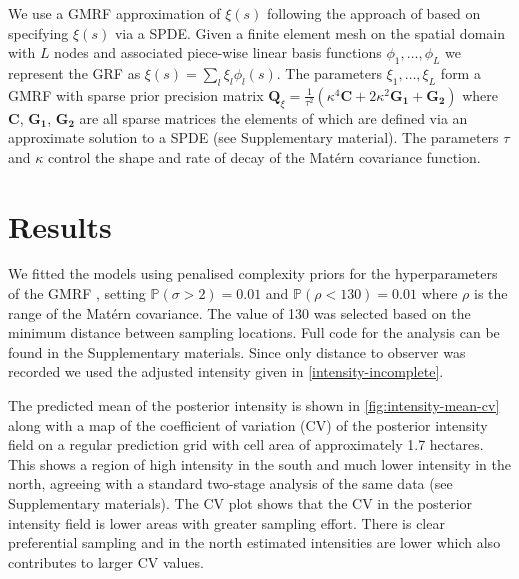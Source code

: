\documentclass[preprint,12pt]{elsarticle}
\newcommand{\bm}{\boldsymbol}  %
\begin{document}
We use a GMRF approximation of $\xi(s)$ following the approach of \cite{lindgren_explicit_2011} based on specifying $\xi(s)$ via a SPDE.  Given a finite element mesh on the spatial domain with $L$ nodes and associated piece-wise linear basis functions $\phi_1, \ldots, \phi_L$ we represent the GRF as $\xi(s) = \sum_l \xi_l \phi_l(s)$.  The parameters $\xi_1, \ldots, \xi_L$ form a GMRF with sparse prior precision matrix $\bm{Q}_{\xi} = \frac{1}{\tau^2}\left(\kappa^4\bm{C} + 2\kappa^2\bm{G_1} + \bm{G_2}\right)$ where $\bm{C}$, $\bm{G_1}$, $\bm{G_2}$ are all sparse matrices the elements of which are defined via an approximate solution to a SPDE (see Supplementary material). The parameters $\tau$ and $\kappa$ control the shape and rate of decay of the Mat\'ern covariance function.

\section{Results}

We fitted the models using penalised complexity priors for the hyperparameters of the GMRF \citep{simpson_penalising_2017}, setting $\mathbb{P}(\sigma > 2) = 0.01$ and $\mathbb{P}(\rho < 130) = 0.01$ where $\rho$ is the range of the Mat\'ern covariance.  The value of 130 was selected based on the minimum distance between sampling locations.  Full code for the analysis can be found in the Supplementary materials.  Since only distance to observer was recorded we used the adjusted intensity given in \eqref{intensity-incomplete}.   

The predicted mean of the posterior intensity is shown in \autoref{fig:intensity-mean-cv} along with a map of the coefficient of variation (CV) of the posterior intensity field on a regular prediction grid with cell area of approximately 1.7 hectares.  This shows a region of high intensity in the south and much lower intensity in the north, agreeing with a standard two-stage analysis of the same data (see Supplementary materials).  The CV plot shows that the CV in the posterior intensity field is lower areas with greater sampling effort.  There is clear preferential sampling and in the north estimated intensities are lower which also contributes to larger CV values.
\end{document}
